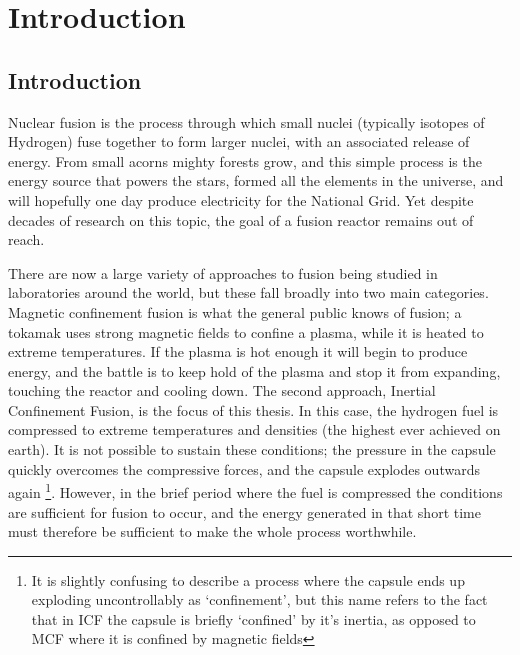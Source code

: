 

\chapter{\label{ch:intro}Introduction} 

\minitoc

\section{Introduction}
Nuclear fusion is the process through which small nuclei (typically isotopes of Hydrogen) fuse together to form larger nuclei, with an associated release of energy. From small acorns mighty forests grow, and this simple process is the energy source that powers the stars, formed all the elements in the universe, and will hopefully one day produce electricity for the National Grid. Yet despite decades of research on this topic, the goal of a fusion reactor remains out of reach.

There are now a large variety of approaches to fusion being studied in laboratories around the world, but these fall broadly into two main categories. Magnetic confinement fusion is what the general public knows of fusion; a tokamak uses strong magnetic fields to confine a plasma, while it is heated to extreme temperatures. If the plasma is hot enough it will begin to produce energy, and the battle is to keep hold of the plasma and stop it from expanding, touching the reactor and cooling down. The second approach, Inertial Confinement Fusion, is the focus of this thesis. In this case, the hydrogen fuel is compressed to extreme temperatures and densities (the highest ever achieved on earth). It is not possible to sustain these conditions; the pressure in the capsule quickly overcomes the compressive forces, and the capsule explodes outwards again \footnote{It is slightly confusing to describe a process where the capsule ends up exploding uncontrollably as `confinement', but this name refers to the fact that in ICF the capsule is briefly `confined' by it's inertia, as opposed to MCF where it is confined by magnetic fields}. However, in the brief period where the fuel is compressed the conditions are sufficient for fusion to occur, and the energy generated in that short time must therefore be sufficient to make the whole process worthwhile.

